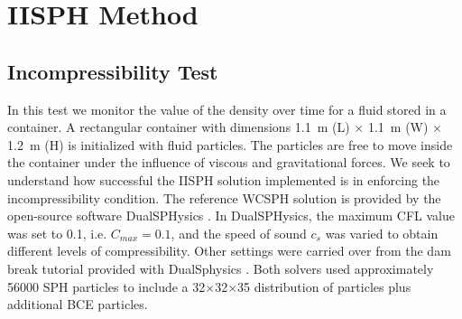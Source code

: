\section{IISPH Method}\label{sec:IISPH_Val}
\subsection{Incompressibility Test}
\label{subsec:incompressibilityTest}
In this test we monitor the value of the density over time for a fluid stored in a container. A rectangular container with dimensions \SI{1.1}{m} (L) $\times$ \SI{1.1}{m} (W) $\times$ \SI{1.2}{m} (H) is initialized with fluid particles. The particles are free to move inside the container under the influence of viscous and gravitational forces. We seek to understand how successful the IISPH solution implemented is in enforcing the incompressibility condition. The reference WCSPH solution is provided by the open-source software DualSPHysics  \cite{crespo2015dualsphysics}. In DualSPHysics, the maximum CFL value was set to \num{0.1}, i.e. $C_{max}=0.1$, and the speed of sound $c_s$ was varied to obtain different levels of compressibility. Other settings were carried over from the dam break tutorial provided with DualSphysics \cite{crespo2015dualsphysics}. Both solvers used approximately \num{56000} SPH particles to include a \num{32}$\times$\num{32}$\times$\num{35} distribution of particles plus additional BCE particles. 

